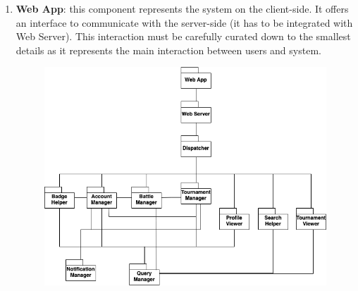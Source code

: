 \begin{enumerate}
\begin{figure}[H]
    \end{figure} 
    \vspace{0.5cm}
    \newpage
    \item \textbf{Web App}: this component represents the system on the client-side. It offers an interface to communicate with the server-side (it has to be integrated with Web Server). This interaction must be carefully curated down to the smallest details as it represents the main interaction between users and system.
    \vspace{0.5cm}
    \begin{figure}[H]
        \centering
        \includegraphics[scale=0.6]{src/phase10.drawio.png}
    \end{figure} 
    \vspace{0.5cm}
\end{enumerate}

\vspace{1cm}

